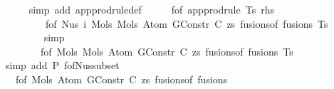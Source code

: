 \begin{isabellebody}
\ \ \ \ \isamarkupfalse%
\ {\isacharparenleft}{\kern0pt}simp\ add{\isacharcolon}{\kern0pt}\ app{\isacharunderscore}{\kern0pt}prodrule{\isacharunderscore}{\kern0pt}def{\isacharparenright}{\kern0pt}\isanewline
\ \ \isamarkupfalse%
\ \isamarkupfalse%
\ {\isachardoublequoteopen}f{\isacharunderscore}{\kern0pt}of\ {\isacharparenleft}{\kern0pt}app{\isacharunderscore}{\kern0pt}prodrule\ Ts\ rhs{\isacharparenright}{\kern0pt}\ {\isasymsupseteq}{\isacharhash}{\kern0pt}\isanewline
\ \ \ \ \ \ \ \ \ f{\isacharunderscore}{\kern0pt}of\ {\isacharparenleft}{\kern0pt}Nus{}\ i\ {\isacharparenleft}{\kern0pt}Mols{}\ {\isacharparenleft}{\kern0pt}Mols{}\ {\isacharparenleft}{\kern0pt}Atom\ {\isacharparenleft}{\kern0pt}GConstr\ C{\isacharparenright}{\kern0pt}\ zs{\isacharparenright}{\kern0pt}\ {\isacharparenleft}{\kern0pt}fusions{\isacharunderscore}{\kern0pt}of\ fusions{\isacharparenright}{\kern0pt}{\isacharparenright}{\kern0pt}\ Ts{\isacharparenright}{\kern0pt}{\isacharparenright}{\kern0pt}{\isachardoublequoteclose}\isanewline
\ \ \ \ \ \ \ \isamarkupfalse%
\ simp\isanewline
\ \ \isamarkupfalse%
\ \isamarkupfalse%
\ {\isachardoublequoteopen}{\isachardot}{\kern0pt}{\isachardot}{\kern0pt}{\isachardot}{\kern0pt}\ {\isasymsupseteq}{\isacharhash}{\kern0pt}\isanewline
\ \ \ \ \ \ \ \ f{\isacharunderscore}{\kern0pt}of\ {\isacharparenleft}{\kern0pt}Mols{}\ {\isacharparenleft}{\kern0pt}Mols{}\ {\isacharparenleft}{\kern0pt}Atom\ {\isacharparenleft}{\kern0pt}GConstr\ C{\isacharparenright}{\kern0pt}\ zs{\isacharparenright}{\kern0pt}\ {\isacharparenleft}{\kern0pt}fusions{\isacharunderscore}{\kern0pt}of\ fusions{\isacharparenright}{\kern0pt}{\isacharparenright}{\kern0pt}\ Ts{\isacharparenright}{\kern0pt}{\isachardoublequoteclose}\isanewline
\ \ \ \ \ \ \ \ \isamarkupfalse%
\ {\isacharparenleft}{\kern0pt}simp\ add{\isacharcolon}{\kern0pt}\ P{}\ f{\isacharunderscore}{\kern0pt}of{\isacharunderscore}{\kern0pt}Nus{\isacharunderscore}{\kern0pt}subset{\isacharparenright}{\kern0pt}\isanewline
\ \ \isamarkupfalse%
\ \isamarkupfalse%
\ {\isachardoublequoteopen}{\isachardot}{\kern0pt}{\isachardot}{\kern0pt}{\isachardot}{\kern0pt}\ {\isasymsupseteq}{\isacharhash}{\kern0pt}\ f{\isacharunderscore}{\kern0pt}of\ {\isacharparenleft}{\kern0pt}Mols{}\ {\isacharparenleft}{\kern0pt}Atom\ {\isacharparenleft}{\kern0pt}GConstr\ C{\isacharparenright}{\kern0pt}\ zs{\isacharparenright}{\kern0pt}\ {\isacharparenleft}{\kern0pt}fusions{\isacharunderscore}{\kern0pt}of\ fusions{\isacharparenright}{\kern0pt}{\isacharparenright}{\kern0pt}{\isachardoublequoteclose}\isanewline

\end{isabellebody}
